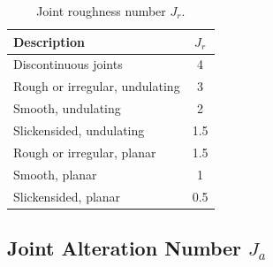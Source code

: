 \documentclass[a4paper,12pt]{article}
\begin{document}
\begin{table}[H]
\centering
\small
\begin{tabularx}{0.85\textwidth}{Y c}
\toprule
\textbf{Description} & \textbf{\(J_r\)} \\
\midrule
Discontinuous joints & 4 \\
Rough or irregular, undulating & 3 \\
Smooth, undulating & 2 \\
Slickensided, undulating & 1.5 \\
Rough or irregular, planar & 1.5 \\
Smooth, planar & 1 \\
Slickensided, planar & 0.5 \\
\bottomrule
\end{tabularx}
\caption{Joint roughness number \(J_r\).}
\label{tab:jr}
\end{table}

\subsection{Joint Alteration Number \(J_a\)}
\end{document}
